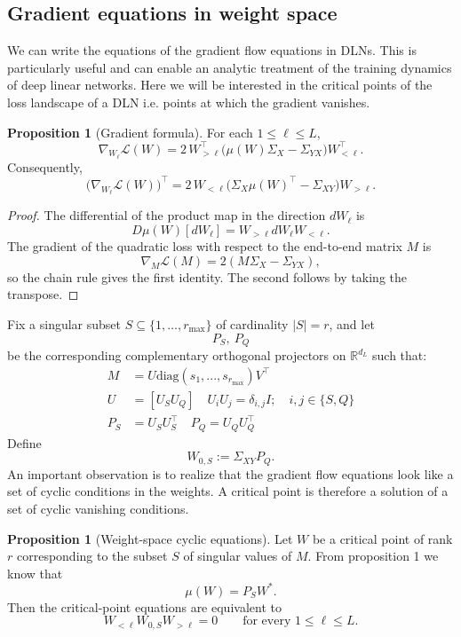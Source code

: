 \documentclass[11pt]{article}
\newcommand{\R}{\mathbb{R}}
\theoremstyle{definition}
\newtheorem{proposition}[theorem]{Proposition}
\begin{document}
\subsection{Gradient equations in weight space}
We can write the equations of the gradient flow equations in DLNs. This is particularly useful and can enable an analytic treatment of the training dynamics of deep linear networks. Here we will be interested in the critical points of the loss landscape of a DLN i.e. points at which the gradient vanishes. 
\begin{proposition}[Gradient formula]
For each \(1\leq \ell\leq L\),
\[
\nabla_{W_\ell}\mathcal L(W)
=
2\,W_{>\ell}^{\top}\bigl(\mu(W)\Sigma_X-\Sigma_{YX}\bigr)W_{<\ell}^{\top}.
\]
Consequently,
\[
\bigl(\nabla_{W_\ell}\mathcal L(W)\bigr)^\top
=
2\,W_{<\ell}\bigl(\Sigma_X\mu(W)^\top-\Sigma_{XY}\bigr)W_{>\ell}.
\]
\end{proposition}

\begin{proof}
The differential of the product map in the direction \(d W_\ell\) is
\[
D\mu(W)[d W_\ell]=W_{>\ell}dW_\ell W_{<\ell}.
\]
The gradient of the quadratic loss with respect to the end-to-end matrix \(M\)
is
\[
\nabla_M\mathcal L(M)=2(M\Sigma_X-\Sigma_{YX}),
\]
so the chain rule gives the first identity. The second follows by taking the
transpose.
\end{proof}

Fix a singular subset \(S\subseteq \{1,\dots,r_{\max}\}\) of cardinality
\(|S|=r\), and let
\[
P_S,\ P_Q
\]
be the corresponding complementary orthogonal projectors on \(\R^{d_L}\) such that:
\begin{align*}
  M & = U\text{diag}(s_1,...,s_{r_{\max}})V^{\top} \\
  U & = [U_S U_Q] \quad U_iU_j = \delta_{i,j} I; \quad i,j\in\{S,Q\} \\ 
  P_S & = U_SU_S^{\top} \quad P_Q = U_QU_Q^{\top}
\end{align*}
Define
\[
W_{0,S}:=\Sigma_{XY}P_Q.
\]
An important observation is to realize that the gradient flow equations look like a set of cyclic conditions in the weights. A critical point is therefore a solution of a set of cyclic vanishing conditions.
\begin{proposition}[Weight-space cyclic equations]
Let \(W\) be a critical point of rank \(r\) corresponding to the subset \(S\) of singular values of $M$. From \cite{achour2024loss} proposition 1 we know that
\[
\mu(W)=P_SW^\ast.
\]
Then the critical-point equations are equivalent to
\[
W_{<\ell}W_{0,S}W_{>\ell}=0
\qquad
\text{for every }1\leq \ell\leq L.
\]
\end{proposition}
\end{document}
